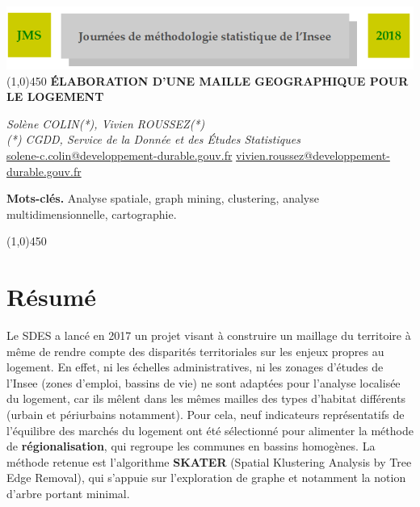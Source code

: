\documentclass[12pt, a4paper]{article}
\begin{document}
\begin{center}
\includegraphics[width=15cm]{head_jms2018.png} 
\line(1,0){450}
\vspace{5mm}
\textbf{{\huge \'E}\Large LABORATION D'UNE MAILLE GEOGRAPHIQUE POUR LE LOGEMENT}
\end{center}

\begin{center}
\textit{Solène COLIN(*), Vivien ROUSSEZ(*)} \\
\vspace{2mm}
\textit{(*) CGDD, Service de la Donnée et des \'Etudes Statistiques}\\ 

\vspace{2mm}
\url{solene-c.colin@developpement-durable.gouv.fr} \url{vivien.roussez@developpement-durable.gouv.fr} 
\end{center}
\vspace{5mm}
\small{{\bf Mots-cl\'es.} Analyse spatiale, graph mining, clustering, analyse multidimensionnelle, cartographie.}

\begin{center}
\line(1,0){450}
\end{center}


\section*{Résumé}

Le SDES a lancé en 2017 un projet visant à construire un maillage du territoire à même de rendre compte des disparités territoriales sur les enjeux propres au logement. En effet, ni les échelles administratives, ni les zonages d'études de l'Insee (zones d'emploi, bassins de vie) ne sont adaptées pour l'analyse localisée du logement, car ils mêlent dans les mêmes mailles des types d'habitat différents (urbain et périurbains notamment). Pour cela, neuf indicateurs représentatifs de l'équilibre des marchés du logement ont été sélectionné pour alimenter la méthode de \textbf{régionalisation}, qui regroupe les communes en bassins homogènes. La méthode retenue est l'algorithme \textbf{SKATER} (Spatial Klustering Analysis by Tree Edge Removal), qui s'appuie sur l'exploration de graphe et notamment la notion d'arbre portant minimal. \\
\end{document}
